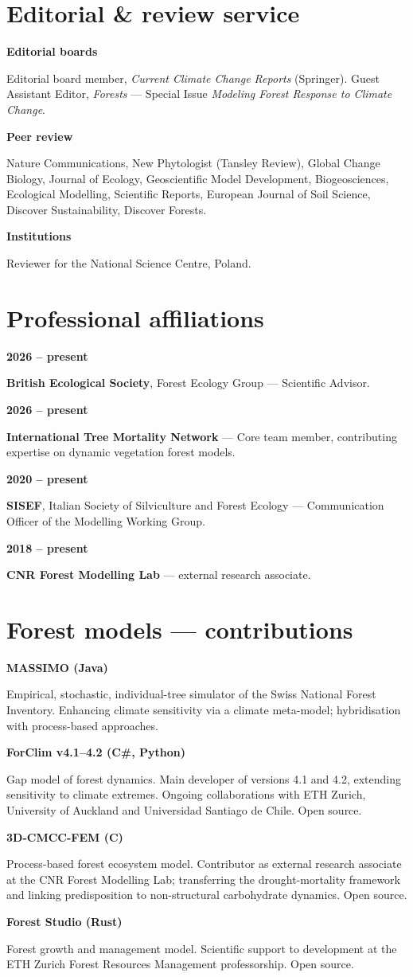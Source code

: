 \documentclass[10pt,a4paper]{article}
\newlength{\dcol}\setlength{\dcol}{3.5cm}
\newcommand{\defrow}[2]{%
  \noindent\begin{minipage}[t]{\dcol}\raggedright\footnotesize\bfseries\color{muted}#1\end{minipage}%
  \hspace{0.45cm}%
  \begin{minipage}[t]{\dimexpr\linewidth-\dcol-0.45cm\relax}\raggedright\small\color{inksoft}#2\end{minipage}\par\vspace{5pt}}
\begin{document}
\section*{Editorial \& review service}
\defrow{Editorial boards}{Editorial board member, \emph{Current Climate Change Reports} (Springer). Guest Assistant Editor, \emph{Forests} --- Special Issue \emph{Modeling Forest Response to Climate Change}.}
\defrow{Peer review}{Nature Communications, New Phytologist (Tansley Review), Global Change Biology, Journal of Ecology, Geoscientific Model Development, Biogeosciences, Ecological Modelling, Scientific Reports, European Journal of Soil Science, Discover Sustainability, Discover Forests.}
\defrow{Institutions}{Reviewer for the National Science Centre, Poland.}

\section*{Professional affiliations}
\defrow{2026 -- present}{\textbf{British Ecological Society}, Forest Ecology Group --- Scientific Advisor.}
\defrow{2026 -- present}{\textbf{International Tree Mortality Network} --- Core team member, contributing expertise on dynamic vegetation forest models.}
\defrow{2020 -- present}{\textbf{SISEF}, Italian Society of Silviculture and Forest Ecology --- Communication Officer of the Modelling Working Group.}
\defrow{2018 -- present}{\textbf{CNR Forest Modelling Lab} --- external research associate.}

\section*{Forest models --- contributions}
\defrow{MASSIMO \textnormal{(Java)}}{Empirical, stochastic, individual-tree simulator of the Swiss National Forest Inventory. Enhancing climate sensitivity via a climate meta-model; hybridisation with process-based approaches.}
\defrow{ForClim v4.1--4.2 \textnormal{(C\#, Python)}}{Gap model of forest dynamics. Main developer of versions 4.1 and 4.2, extending sensitivity to climate extremes. Ongoing collaborations with ETH Zurich, University of Auckland and Universidad Santiago de Chile. Open source.}
\defrow{3D-CMCC-FEM \textnormal{(C)}}{Process-based forest ecosystem model. Contributor as external research associate at the CNR Forest Modelling Lab; transferring the drought-mortality framework and linking predisposition to non-structural carbohydrate dynamics. Open source.}
\defrow{Forest Studio \textnormal{(Rust)}}{Forest growth and management model. Scientific support to development at the ETH Zurich Forest Resources Management professorship. Open source.}
\end{document}
